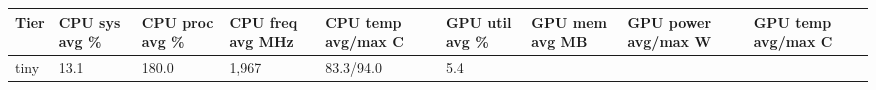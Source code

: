 \documentclass[
  9pt, a4paper, landscape]{article}
\begin{document}
\begin{longtable}[]{@{}lllllllll@{}}
\toprule
\begin{minipage}[b]{0.08\columnwidth}\raggedright
Tier\strut
\end{minipage} & \begin{minipage}[b]{0.08\columnwidth}\raggedright
CPU sys avg \%\strut
\end{minipage} & \begin{minipage}[b]{0.08\columnwidth}\raggedright
CPU proc avg \%\strut
\end{minipage} & \begin{minipage}[b]{0.08\columnwidth}\raggedright
CPU freq avg MHz\strut
\end{minipage} & \begin{minipage}[b]{0.08\columnwidth}\raggedright
CPU temp avg/max C\strut
\end{minipage} & \begin{minipage}[b]{0.08\columnwidth}\raggedright
GPU util avg \%\strut
\end{minipage} & \begin{minipage}[b]{0.08\columnwidth}\raggedright
GPU mem avg MB\strut
\end{minipage} & \begin{minipage}[b]{0.08\columnwidth}\raggedright
GPU power avg/max W\strut
\end{minipage} & \begin{minipage}[b]{0.08\columnwidth}\raggedright
GPU temp avg/max C\strut
\end{minipage}\tabularnewline
\midrule
\endhead
\begin{minipage}[t]{0.08\columnwidth}\raggedright
tiny\strut
\end{minipage} & \begin{minipage}[t]{0.08\columnwidth}\raggedright
13.1\strut
\end{minipage} & \begin{minipage}[t]{0.08\columnwidth}\raggedright
180.0\strut
\end{minipage} & \begin{minipage}[t]{0.08\columnwidth}\raggedright
1,967\strut
\end{minipage} & \begin{minipage}[t]{0.08\columnwidth}\raggedright
83.3/94.0\strut
\end{minipage} & \begin{minipage}[t]{0.08\columnwidth}\raggedright
5.4\strut
\end{minipage} & \begin{minipage}[t]{0.08\columnwidth}\raggedright

\end{minipage}
\end{longtable}
\end{document}
